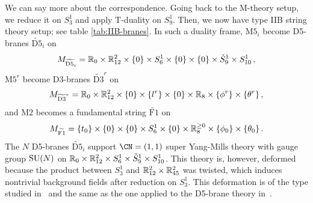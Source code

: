 We can say more about the correspondence.
Going back to the M-theory setup, we reduce it on $S^1_3$ and apply
T-duality on $S^1_9$.  Then, we now have type IIB string theory setup;
see table \ref{tab:IIB-branes}.
In such a duality frame, $\mathrm{M5}_i$ become D5-branes
$\widetilde{\mathrm{D5}}_i$ on
\begin{equation}
  M_{\widetilde{\mathrm{D5}_i}}
  =
  \mathbb{R}_0 \times \mathbb{R}^2_{12} \times \{0\} \times S^1_6
  \times \{0\} \times \{0\} \times \check{S}^1_9 \times S^1_{10} \,,
\end{equation}
$\mathrm{M5}^r$ become D3-branes $\widetilde{\mathrm{D3}}^r$ on
\begin{equation}
  M_{\widetilde{\mathrm{D3}}^r}
  =
  \mathbb{R}_0 \times \mathbb{R}^2_{12} \times \{0\} \times \{l^r\}
  \times \{0\} \times \mathbb{R}_8 \times \{\phi^r\} \times \{\theta^r\} \,,
\end{equation}
and $\mathrm{M2}$ becomes a fundamental string $\widetilde{\mathrm{F1}}$ on
\begin{equation}
  M_{\widetilde{\mathrm{F1}}}
  =
  \{t_0\} \times \{0\} \times \{0\}
  \times S^1_6 \times \{0\} \times \mathbb{R}^{\geq0}_8
  \times \{\phi_0\} \times \{\theta_0\} \,.
\end{equation}
The $N$ D5-branes $\widetilde{\mathrm{D5}}_i$ support $\CN = (1,1)$
super Yang-Mills theory with gauge group $\mathrm{SU}(N)$ on
$\mathbb{R}_0 \times \mathbb{R}^2_{12} \times S^1_6 \times \check{S}^1_9 \times
S^1_{10}$.  This theory is, however, deformed because the product
between $S^1_3$ and $\mathbb{R}^2_{12} \times \mathbb{R}^2_{45}$ was twisted, which
induces nontrivial background fields after reduction on $S^1_3$.  This
deformation is of the type studied in~\cite{Yagi:2014toa} and the same
as the one applied to the D5-brane theory in~\cite{Costello:2018txb}.%
%
